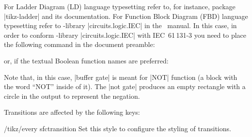 \documentclass[a4paper]{ltxdoc}
\begin{document}
For Ladder Diagram (LD) language typesetting refer to, for instance, package |tikz-ladder| and its documentation. For Function Block Diagram (FBD) language typesetting refer to \tikzname-library |circuits.logic.IEC| in the \tikzname\ manual. In this case, in order to conform \tikzname-library |circuits.logic.IEC| with IEC~61\,131-3 you need to place the following command in the document preamble:

\begin{codeexample}
\end{codeexample}
\noindent{}or, if the textual Boolean function names are preferred:

\begin{codeexample}
\end{codeexample}
\noindent{}Note that, in this case, |buffer gate| is meant for |NOT| function (a block with the word ``NOT'' inside of it). The |not gate| produces an empty rectangle with a circle in the output to represent the negation.

Transitions are affected by the following keys:

\begin{stylekey}{/tikz/every sfctransition}
  Set this style to configure the styling of transitions.
\begin{codeexample}[width=1.5cm]
\end{codeexample}
\end{stylekey}
\end{document}
